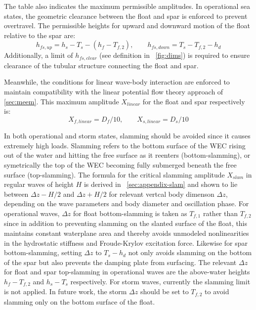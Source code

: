 The table also indicates the maximum permissible amplitudes.
In operational sea states, the geometric clearance between the float and spar is enforced to prevent overtravel.
The permissible heights for upward and downward motion of the float relative to the spar are:
\begin{equation}\label{eq:h-fs-up-down}
    h_{fs,up} = h_s - T_s - (h_f- T_{f,2}), \qquad h_{fs,down} = T_s - T_{f,2} - h_d
\end{equation}
Additionally, a limit of $h_{fs,clear}$ (see definition in \figureautorefname~\ref{fig:dims}) is required to ensure clearance of the tubular structure connecting the float and spar.

Meanwhile, the conditions for linear wave-body interaction are enforced to maintain compatibility with the linear potential flow theory approach of \ref{sec:meem}.
This maximum amplitude $X_{linear}$ for the float and spar respectively is:
\begin{equation}
    X_{f,linear} = D_f/10, \qquad X_{s,linear}  =D_s/10
\end{equation}

In both operational and storm states, slamming should be avoided since it causes extremely high loads.
Slamming refers to the bottom surface of the WEC rising out of the water and hitting the free surface as it reenters (bottom-slamming), or symetrically the top of the WEC becoming fully submerged beneath the free surface (top-slamming).
The formula for the critical slamming amplitude $X_{slam}$ in regular waves of height $H$ is derived in \appendixname~\ref{sec:appendix-slam} and shown to lie between $\Delta z-H/2$ and $\Delta z+H/2$ for relevant vertcal body dimenson $\Delta z$, depending on the wave parameters and body diameter and oscillation phase.
For operational waves, $\Delta z$ for float bottom-slamming is taken as $T_{f,1}$ rather than $T_{f,2}$ since in addition to preventing slamming on the slanted surface of the float, this maintains constant waterplane area and thereby avoids unmodeled nonlinearities in the hydrostatic stiffness and Froude-Krylov excitation force.
Likewise for spar bottom-slamming, setting $\Delta z$ to $T_s-h_d$ not only avoids slamming on the bottom of the spar but also prevents the damping plate from surfacing.
The relevant $\Delta z$ for float and spar top-slamming in operational waves are the above-water heights $h_f-T_{f,2}$ and $h_s-T_s$ respectively.
For storm waves, currently the slamming limit is not applied.
In future work, the storm $\Delta z$ should be set to $T_{f,2}$ to avoid slamming only on the bottom surface of the float.

